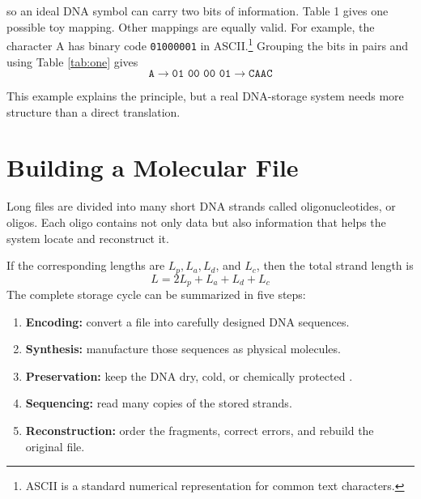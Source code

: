 \documentclass{article}
\begin{document}
so an ideal DNA symbol can carry two bits of information.
Table 1 gives one possible toy mapping. Other mappings are equally valid.
For example, the character A has binary code \texttt{01000001} in ASCII.\footnote{ASCII is a standard numerical representation for common text characters.} Grouping the bits in pairs and using
Table \ref{tab:one} gives
\begin{equation}
    \texttt{A} \rightarrow \texttt{01 00 00 01} \rightarrow \texttt{CAAC}
\end{equation}

This example explains the principle, but a real DNA-storage system needs more structure than a direct
translation.


\section{Building a Molecular File}
Long files are divided into many short DNA strands called oligonucleotides, or oligos. Each oligo
contains not only data but also information that helps the system locate and reconstruct it.
\begin{center}
    \ttfamily\small
    \hspace{2mm}
    \hspace{2mm}
    \hspace{2mm}
    \hspace{2mm}
\end{center}
If the corresponding lengths are $L_p, L_a, L_d$, and $L_c$, then the total strand length is
\begin{equation}
    L = 2L_p + L_a + L_d + L_c
    \label{eqn:three}
\end{equation}
The complete storage cycle can be summarized in five steps:

\begin{enumerate}[label=\Roman*.]
    \item \textbf{Encoding:} convert a file into carefully designed DNA sequences.
    \item \textbf{Synthesis:} manufacture those sequences as physical molecules.
    \item \textbf{Preservation:} keep the DNA dry, cold, or chemically protected \cite{erlich2017}.
    \item \textbf{Sequencing:} read many copies of the stored strands.
    \item \textbf{Reconstruction:} order the fragments, correct errors, and rebuild the original file.
\end{enumerate}
\end{document}
